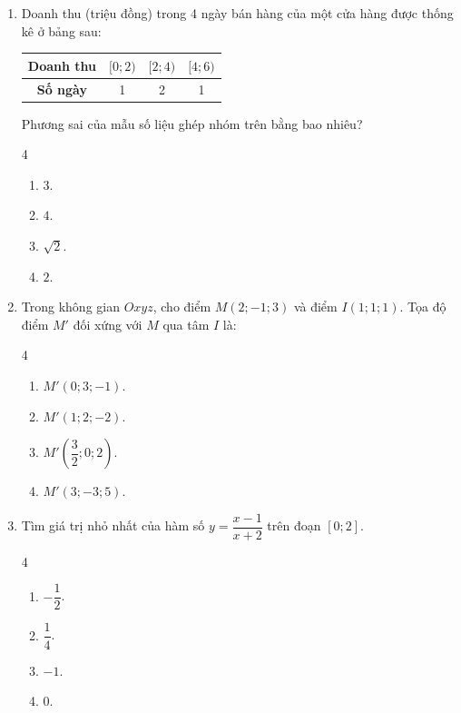 \documentclass[12pt]{article}
\begin{document}
\begin{enumerate}[label=\textbf{Câu \arabic*.}, leftmargin=*]
		\item Doanh thu (triệu đồng) trong 4 ngày bán hàng của một cửa hàng được thống kê ở bảng sau:
		\begin{center}
			\begin{tabular}{|c|c|c|c|}
				\hline
				\textbf{Doanh thu} & $[0; 2)$ & $[2; 4)$ & $[4; 6)$ \\
				\hline
				\textbf{Số ngày} & 1 & 2 & 1 \\
				\hline
			\end{tabular}
		\end{center}
		Phương sai của mẫu số liệu ghép nhóm trên bằng bao nhiêu?
		\begin{multicols}{4}
			\begin{enumerate}[label=\Alph*.]
				\item $3$.
				\item $4$.
				\item $\sqrt{2}$.
				\item $2$.
			\end{enumerate}
		\end{multicols}
		
		\item Trong không gian $Oxyz$, cho điểm $M(2; -1; 3)$ và điểm $I(1; 1; 1)$. Tọa độ điểm $M'$ đối xứng với $M$ qua tâm $I$ là:
		\begin{multicols}{4}
			\begin{enumerate}[label=\Alph*.]
				\item $M'(0; 3; -1)$.
				\item $M'(1; 2; -2)$.
				\item $M'\left( \dfrac{3}{2}; 0; 2 \right)$.
				\item $M'(3; -3; 5)$.
			\end{enumerate}
		\end{multicols}
		
		\item Tìm giá trị nhỏ nhất của hàm số $y = \dfrac{x - 1}{x + 2}$ trên đoạn $[0; 2]$.
		\begin{multicols}{4}
			\begin{enumerate}[label=\Alph*.]
				\item $-\dfrac{1}{2}$.
				\item $\dfrac{1}{4}$.
				\item $-1$.
				\item $0$.
			\end{enumerate}
		\end{multicols}
		
	\end{enumerate}
	
\end{document}
